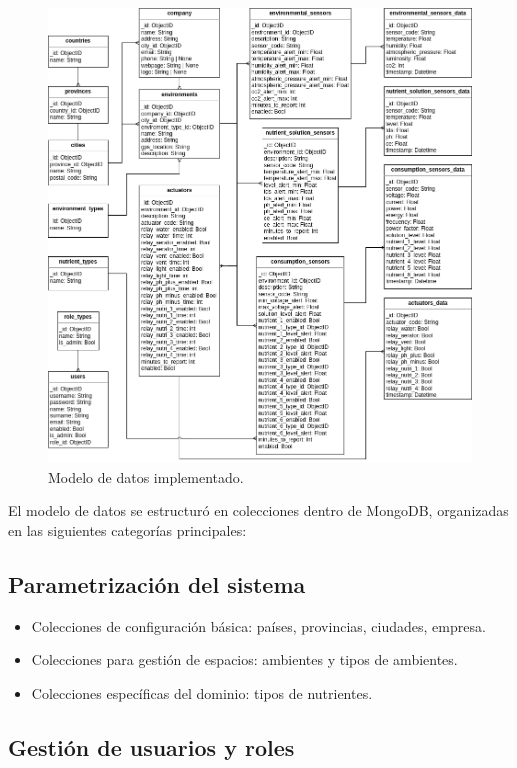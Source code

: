 \begin{figure}[H]
    \centering
    \includegraphics[width=.99\textwidth]{./Images/15.png}
    \caption{Modelo de datos implementado.}
    \label{fig:modelo de datos}
\end{figure}

El modelo de datos se estructuró en colecciones dentro de MongoDB, organizadas
en las siguientes categorías principales:

\subsection{Parametrización del sistema}

\begin{itemize}
    \item Colecciones de configuración básica: países, provincias, ciudades, empresa.
    \item Colecciones para gestión de espacios: ambientes y tipos de ambientes.
    \item Colecciones específicas del dominio: tipos de nutrientes.
\end{itemize}

\subsection{Gestión de usuarios y roles}

